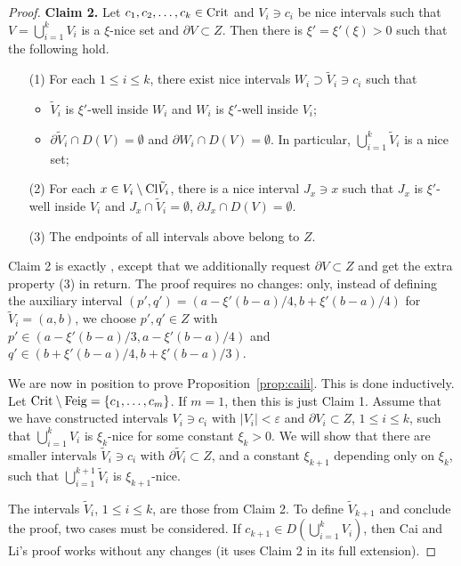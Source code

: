 \documentclass[12pt, psamsfonts, reqno]{amsart}
\begin{document}
\begin{proof}
 \textbf{Claim 2.} Let $c_1,c_2,\ldots,c_k\in {\mathop{\rm Crit}\nolimits}$ and $V_i\owns
 c_i$ be nice intervals such that $V=\bigcup_{i=1}^k V_i$ is a
 $\xi$-nice set and $\partial V\subset Z$.
 Then there is $\xi'=\xi'(\xi)>0$  such that the following hold.
 \begin{itemize}
  \item[(1)] For each $1\leq i\leq k$, there exist nice intervals
  $W_i\supset \tilde V_i\owns c_i$ such that
   \begin{itemize}
   \item $\tilde V_i$ is $\xi'$-well inside $W_i$ and $W_i$ is
   $\xi'$-well inside $V_i$;
   \item $\partial \tilde V_i\cap D(V)=\emptyset$ and $\partial W_i\cap
   D(V)=\emptyset$. In particular, $\bigcup_{i=1}^k \tilde V_i$ is a
   nice set;
   \end{itemize}
  \item[(2)] For each $x\in V_i\setminus {\mathop{\rm Cl}\nolimits} \tilde V_i$, there is a
  nice interval  $J_x\owns x$ such that $J_x$ is
  $\xi'$-well inside $V_i$ and $J_x\cap \tilde V_i=\emptyset$,
  $\partial J_x\cap D(V)=\emptyset$.
  \item[(3)] The endpoints of all intervals above belong to $Z$.
 \end{itemize}

 Claim 2 is exactly \cite[Lemma~3]{caili}, except that we additionally
 request $\partial V\subset Z$ and get the extra property (3) in
 return. The proof requires no changes: only, instead of defining
 the auxiliary interval $(p',q')=
 (a-\xi'(b-a)/4, b+\xi'(b-a)/4)$ for $\tilde V_i=(a,b)$,
 we choose $p',q'\in Z$ with $p'\in (a-\xi'(b-a)/3, a-\xi'(b-a)/4)$ and
 $q'\in (b+\xi'(b-a)/4,b+\xi'(b-a)/3)$.

 We are now in position to prove Proposition~\ref{prop:caili}.
 This is done inductively. Let ${\mathop{\rm Crit}\nolimits}\setminus {\mathop{\rm Feig}\nolimits}=\{c_1,\ldots, c_m\}$.
 If $m=1$, then this is just Claim 1. Assume that we have
 constructed intervals $V_i\owns c_i$ with $|V_i|<{\varepsilon}$ and
 $\partial V_i\subset Z$,
 $1\leq i\leq k$, such that $\bigcup_{i=1}^k V_i$ is $\xi_k$-nice for
 some constant $\xi_k>0$. We will show that there are smaller
 intervals $\tilde V_i\owns c_i$ with $\partial \tilde V_i\subset Z$,
 and a constant $\xi_{k+1}$
 depending only on $\xi_k$, such that $\bigcup_{i=1}^{k+1} \tilde V_i$ is
 $\xi_{k+1}$-nice.

 The intervals $\tilde V_i$, $1\leq i\leq k$, are those
 from Claim 2. To define $\tilde V_{k+1}$ and conclude the proof,
 two cases must be considered. If $c_{k+1}\in D(\bigcup_{i=1}^k V_i)$,
 then Cai and Li's proof works
 without any changes (it uses Claim 2 in its full extension).


\end{proof}
\end{document}
